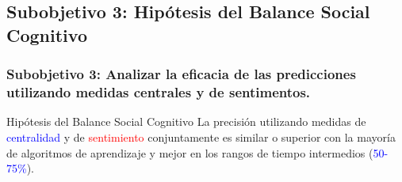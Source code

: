 \documentclass{beamer}
\begin{document}
\subsection{Subobjetivo 3: Hipótesis del Balance Social Cognitivo}


\begin{frame}
	\frametitle{Subobjetivo 3: Analizar la eficacia de las predicciones utilizando medidas centrales y de sentimentos.}
	\begin{block}{Hipótesis del Balance Social Cognitivo}
		La precisión utilizando medidas de \textcolor{blue}{centralidad} y de \textcolor{red}{sentimiento} conjuntamente es similar o superior con la mayoría de algoritmos de aprendizaje y mejor en los rangos de tiempo intermedios (\textcolor{blue}{50-75\%}).
		

\end{block}
\end{frame}
\end{document}
